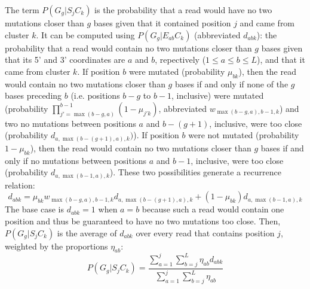 \documentclass[../../MainTexts/main.tex]{subfiles}
\begin{document}
The term $P(G_g | S_j C_k)$ is the probability that a read would have no two mutations closer than $g$ bases given that it contained position $j$ and came from cluster $k$.
It can be computed using $P(G_g | E_{ab} C_k)$ (abbreviated $d_{abk}$): the probability that a read would contain no two mutations closer than $g$ bases given that its 5' and 3' coordinates are $a$ and $b$, repectively ($1 \le a \le b \le L$), and that it came from cluster $k$.
If position $b$ were mutated (probability $\mu_{bk}$), then the read would contain no two mutations closer than $g$ bases if and only if none of the $g$ bases preceding $b$ (i.e. positions $b - g$ to $b - 1$, inclusive) were mutated (probability $\prod_{j'=\max(b-g, a)}^{b-1}(1 - \mu_{j'k})$, abbreviated $w_{\max(b-g, a),b-1,k}$) and two no mutations between positions $a$ and $b - (g + 1)$, inclusive, were too close (probability $d_{a,\max(b-(g+1), a),k})$).
If position $b$ were not mutated (probability $1 - \mu_{bk}$), then the read would contain no two mutations closer than $g$ bases if and only if no mutations between positions $a$ and $b - 1$, inclusive, were too close (probability $d_{a,\max(b-1,a),k}$).
These two possibilities generate a recurrence relation:
$$d_{abk} = \mu_{bk} w_{\max(b-g, a),b-1,k} d_{a,\max(b-(g+1), a),k} + (1 - \mu_{bk}) d_{a,\max(b-1,a),k}$$
The base case is $d_{abk} = 1$ when $a = b$ because such a read would contain one position and thus be guaranteed to have no two mutations too close.
Then, $P(G_g | S_j C_k)$ is the average of $d_{abk}$ over every read that contains position $j$, weighted by the proportions $\eta_{ab}$:
$$P(G_g | S_j C_k) = \frac{\sum_{a=1}^{j}\sum_{b=j}^{L}\eta_{ab}d_{abk}}{\sum_{a=1}^{j}\sum_{b=j}^{L}\eta_{ab}}$$
\end{document}
